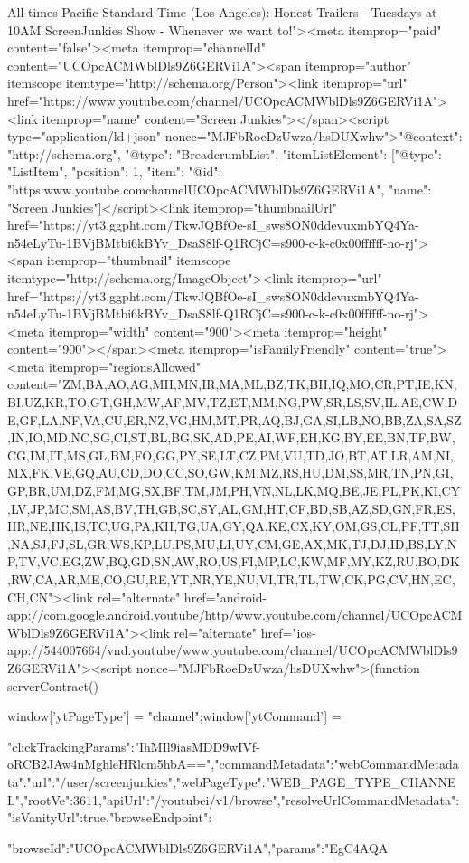 {{{{{{All times Pacific Standard Time (Los Angeles):
Honest Trailers - Tuesdays at 10AM
ScreenJunkies Show - Whenever we want to!"><meta itemprop="paid" content="false"><meta itemprop="channelId" content="UCOpcACMWblDls9Z6GERVi1A"><span itemprop="author" itemscope itemtype="http://schema.org/Person"><link itemprop="url" href="https://www.youtube.com/channel/UCOpcACMWblDls9Z6GERVi1A"><link itemprop="name" content="Screen Junkies"></span><script type="application/ld+json" nonce="MJFbRoeDzUwza/hsDUXwhw">{"@context": "http://schema.org", "@type": "BreadcrumbList", "itemListElement": [{"@type": "ListItem", "position": 1, "item": {"@id": "https:\/\/www.youtube.com\/channel\/UCOpcACMWblDls9Z6GERVi1A", "name": "Screen Junkies"}}]}</script><link itemprop="thumbnailUrl" href="https://yt3.ggpht.com/TkwJQBfOe-sI_sws8ON0ddevuxmbYQ4Ya-n54eLyTu-1BVjBMtbi6kBYv_DsaS8lf-Q1RCjC=s900-c-k-c0x00ffffff-no-rj"><span itemprop="thumbnail" itemscope itemtype="http://schema.org/ImageObject"><link itemprop="url" href="https://yt3.ggpht.com/TkwJQBfOe-sI_sws8ON0ddevuxmbYQ4Ya-n54eLyTu-1BVjBMtbi6kBYv_DsaS8lf-Q1RCjC=s900-c-k-c0x00ffffff-no-rj"><meta itemprop="width" content="900"><meta itemprop="height" content="900"></span><meta itemprop="isFamilyFriendly" content="true"><meta itemprop="regionsAllowed" content="ZM,BA,AO,AG,MH,MN,IR,MA,ML,BZ,TK,BH,IQ,MO,CR,PT,IE,KN,BI,UZ,KR,TO,GT,GH,MW,AF,MV,TZ,ET,MM,NG,PW,SR,LS,SV,IL,AE,CW,DE,GF,LA,NF,VA,CU,ER,NZ,VG,HM,MT,PR,AQ,BJ,GA,SI,LB,NO,BB,ZA,SA,SZ,IN,IO,MD,NC,SG,CI,ST,BL,BG,SK,AD,PE,AI,WF,EH,KG,BY,EE,BN,TF,BW,CG,IM,IT,MS,GL,BM,FO,GG,PY,SE,LT,CZ,PM,VU,TD,JO,BT,AT,LR,AM,NI,MX,FK,VE,GQ,AU,CD,DO,CC,SO,GW,KM,MZ,RS,HU,DM,SS,MR,TN,PN,GI,GP,BR,UM,DZ,FM,MG,SX,BF,TM,JM,PH,VN,NL,LK,MQ,BE,JE,PL,PK,KI,CY,LV,JP,MC,SM,AS,BV,TH,GB,SC,SY,AL,GM,HT,CF,BD,SB,AZ,SD,GN,FR,ES,HR,NE,HK,IS,TC,UG,PA,KH,TG,UA,GY,QA,KE,CX,KY,OM,GS,CL,PF,TT,SH,NA,SJ,FJ,SL,GR,WS,KP,LU,PS,MU,LI,UY,CM,GE,AX,MK,TJ,DJ,ID,BS,LY,NP,TV,VC,EG,ZW,BQ,GD,SN,AW,RO,US,FI,MP,LC,KW,MF,MY,KZ,RU,BO,DK,RW,CA,AR,ME,CO,GU,RE,YT,NR,YE,NU,VI,TR,TL,TW,CK,PG,CV,HN,EC,CH,CN"><link rel="alternate" href="android-app://com.google.android.youtube/http/www.youtube.com/channel/UCOpcACMWblDls9Z6GERVi1A"><link rel="alternate" href="ios-app://544007664/vnd.youtube/www.youtube.com/channel/UCOpcACMWblDls9Z6GERVi1A"><script nonce="MJFbRoeDzUwza/hsDUXwhw">(function serverContract() {window['ytPageType'] = "channel";window['ytCommand'] = {"clickTrackingParams":"IhMIl9iasMDD9wIVf-oRCB2JAw4nMghleHRlcm5hbA==","commandMetadata":{"webCommandMetadata":{"url":"/user/screenjunkies","webPageType":"WEB_PAGE_TYPE_CHANNEL","rootVe":3611,"apiUrl":"/youtubei/v1/browse"},"resolveUrlCommandMetadata":{"isVanityUrl":true}},"browseEndpoint":{"browseId":"UCOpcACMWblDls9Z6GERVi1A","params":"EgC4AQA%

}}}}}}}}}
